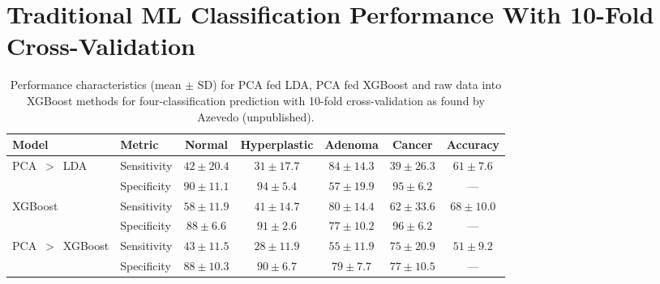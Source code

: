 \section{Traditional ML Classification Performance With 10-Fold Cross-Validation}
\label{appendix:Tiago}
\begin{table}[ht]
  \centering
  
  \label{tab:model_performance}
  \begin{tabular}{@{}l l c c c c c@{}}
    \toprule
    Model & Metric & Normal & Hyperplastic & Adenoma & Cancer & Accuracy \\
    \midrule
    \multirow{2}{*}{PCA~$>$~LDA}
      & Sensitivity & $42\pm20.4$ & $31\pm17.7$ & $84\pm14.3$ & $39\pm26.3$ & $61\pm7.6$ \\
      & Specificity & $90\pm11.1$ & $94\pm5.4$  & $57\pm19.9$ & $95\pm6.2$  & — \\
    \midrule
    \multirow{2}{*}{XGBoost}
      & Sensitivity & $58\pm11.9$ & $41\pm14.7$ & $80\pm14.4$ & $62\pm33.6$ & $68\pm10.0$ \\
      & Specificity & $88\pm6.6$  & $91\pm2.6$  & $77\pm10.2$ & $96\pm6.2$  & — \\
    \midrule
    \multirow{2}{*}{PCA~$>$~XGBoost}
      & Sensitivity & $43\pm11.5$ & $28\pm11.9$ & $55\pm11.9$ & $75\pm20.9$ & $51\pm9.2$ \\
      & Specificity & $88\pm10.3$ & $90\pm6.7$  & $79\pm7.7$  & $77\pm10.5$ & — \\
    \bottomrule
  \end{tabular}
  \label{table:traditional_ml_performance_4_class_Tiago}
  \caption{Performance characteristics (mean $\pm$ SD) for PCA fed LDA, PCA fed XGBoost and raw data into XGBoost methods for four-classification prediction with 10-fold cross-validation as found by Azevedo (unpublished).}
\end{table}